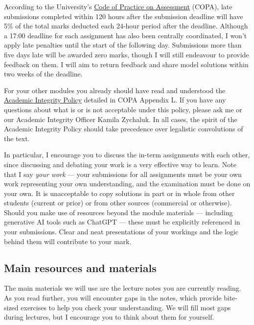 According to the University's \href{https://www.liverpool.ac.uk/media/livacuk/tqsd/code-of-practice-on-assessment/code_of_practice_on_assessment.pdf}{Code of Practice on Assessment} (COPA), late submissions completed within 120 hours after the submission deadline will have 5\% of the total marks deducted each 24-hour period after the deadline. %
Although a 17:00 deadline for each assignment has also been centrally coordinated, I won't apply late penalties until the start of the following day.
Submissions more than five days late will be awarded zero marks, though I will still endeavour to provide feedback on them.
I will aim to return feedback and share model solutions within two weeks of the deadline.

For your other modules you already should have read and understood the \href{https://www.liverpool.ac.uk/media/livacuk/tqsd/code-of-practice-on-assessment/appendix_L_cop_assess.pdf}{Academic Integrity Policy} detailed in COPA Appendix L.
If you have any questions about what is or is not acceptable under this policy, please ask me or our Academic Integrity Officer Kamila Zychaluk.
In all cases, the spirit of the Academic Integrity Policy should take precedence over legalistic convolutions of the text.

In particular, I encourage you to discuss the in-term assignments with each other, since discussing and debating your work is a very effective way to learn.
Note that I say \textit{your work} --- your submissions for all assignments must be your own work representing your own understanding, and the examination must be done on your own.
It is unacceptable to copy solutions in part or in whole from other students (current or prior) or from other sources (commercial or otherwise).
Should you make use of resources beyond the module materials --- including generative AI tools such as ChatGPT --- these must be explicitly referenced in your submissions.
Clear and neat presentations of your workings and the logic behind them will contribute to your mark.



\subsection*{Main resources and materials}
The main materials we will use are the lecture notes you are currently reading.
As you read further, you will encounter gaps in the notes, which provide bite-sized exercises to help you check your understanding.
We will fill most gaps during lectures, but I encourage you to think about them for yourself.

